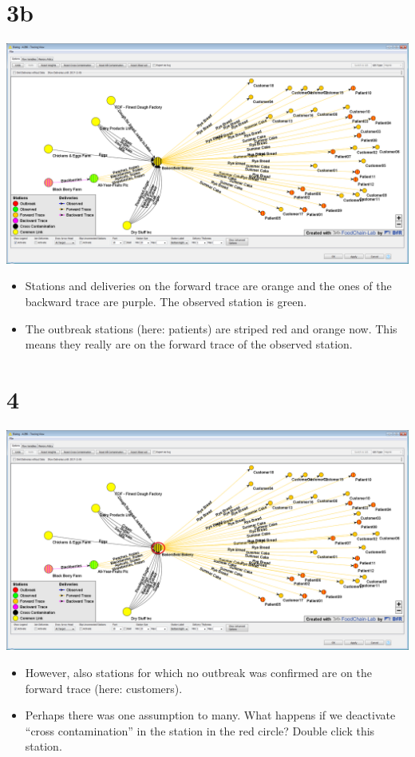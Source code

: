 \documentclass[10pt]{beamer}
\begin{document}
\section{3b}
\begin{frame}
	\begin{center}
  		\includegraphics[height=0.6\textheight]{3b.png}
	\end{center}
	\begin{itemize}
		\item Stations and deliveries on the forward trace are orange and the ones of the backward trace are purple. The observed station is green.
		\item The outbreak stations (here: patients) are striped red and orange now. This means they really are on the forward trace of the observed station.
	\end{itemize}
\end{frame}

\section{4}
\begin{frame}
	\begin{center}
  		\includegraphics[height=0.6\textheight]{4.png}
	\end{center}
	\begin{itemize}
		\item However, also stations for which no outbreak was confirmed are on the forward trace (here: customers).
		\item Perhaps there was one assumption to many. What happens if we deactivate ``cross contamination'' in the station in the red circle? Double click this station.
	\end{itemize}
\end{frame}
\end{document}
